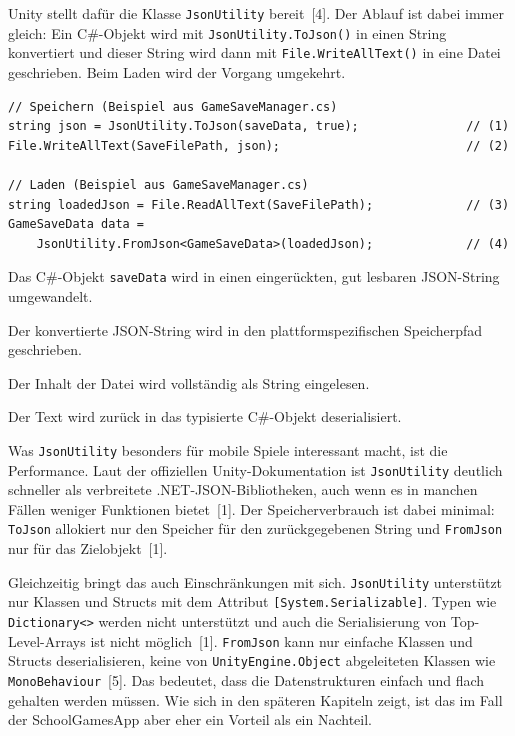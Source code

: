 \documentclass[12pt,a4paper]{article}
\begin{document}
Unity stellt dafür die Klasse \texttt{JsonUtility} bereit~[4]. Der Ablauf ist dabei immer gleich: Ein C\#-Objekt wird mit \texttt{JsonUtility.ToJson()} in einen String konvertiert und dieser String wird dann mit \texttt{File.WriteAllText()} in eine Datei geschrieben. Beim Laden wird der Vorgang umgekehrt.

\begin{lstlisting}
// Speichern (Beispiel aus GameSaveManager.cs)
string json = JsonUtility.ToJson(saveData, true);               // (1)
File.WriteAllText(SaveFilePath, json);                          // (2)

// Laden (Beispiel aus GameSaveManager.cs)
string loadedJson = File.ReadAllText(SaveFilePath);             // (3)
GameSaveData data =
    JsonUtility.FromJson<GameSaveData>(loadedJson);             // (4)
\end{lstlisting}

\begin{description}[leftmargin=2em, labelwidth=1.5em]
    \item[(1)] Das C\#-Objekt \texttt{saveData} wird in einen eingerückten, gut lesbaren JSON-String umgewandelt.
    \item[(2)] Der konvertierte JSON-String wird in den plattformspezifischen Speicherpfad geschrieben.
    \item[(3)] Der Inhalt der Datei wird vollständig als String eingelesen.
    \item[(4)] Der Text wird zurück in das typisierte C\#-Objekt deserialisiert.
\end{description}

Was \texttt{JsonUtility} besonders für mobile Spiele interessant macht, ist die Performance. Laut der offiziellen Unity-Dokumentation ist \texttt{JsonUtility} deutlich schneller als verbreitete .NET-JSON-Bibliotheken, auch wenn es in manchen Fällen weniger Funktionen bietet~[1]. Der Speicherverbrauch ist dabei minimal: \texttt{ToJson} allokiert nur den Speicher für den zurückgegebenen String und \texttt{FromJson} nur für das Zielobjekt~[1].

Gleichzeitig bringt das auch Einschränkungen mit sich. \texttt{JsonUtility} unterstützt nur Klassen und Structs mit dem Attribut \texttt{[System.Serializable]}. Typen wie \texttt{Dictionary<>} werden nicht unterstützt und auch die Serialisierung von Top-Level-Arrays ist nicht möglich~[1]. \texttt{FromJson} kann nur einfache Klassen und Structs deserialisieren, keine von \texttt{UnityEngine.Object} abgeleiteten Klassen wie \texttt{MonoBehaviour}~[5]. Das bedeutet, dass die Datenstrukturen einfach und flach gehalten werden müssen. Wie sich in den späteren Kapiteln zeigt, ist das im Fall der SchoolGamesApp aber eher ein Vorteil als ein Nachteil.
\end{document}
